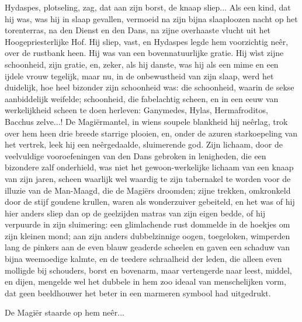 \documentclass[a4paper, 12pt, oneside, dutch]{article}
\begin{document}
Hydaspes, plotseling, zag, dat aan zijn borst, de knaap sliep... Als een kind, dat hij was, was hij in slaap gevallen, vermoeid na zijn bijna slaaploozen nacht op het torenterras, na den Dienst en den Dans, na zijne overhaaste vlucht uit het Hoogepriesterlijke Hof. Hij sliep, vast, en Hydaspes legde hem voorzichtig neêr, over de rustbank heen. Hij was van een bovennatuurlijke gratie. Hij wìst zijne schoonheid, zijn gratie, en, zeker, als hij danste, was hij als een mime en een ijdele vrouw tegelijk, maar nu, in de onbewustheid van zijn slaap, werd het duidelijk, hoe heel bizonder zijn schoonheid was: die schoonheid, waarin de sekse aanbiddelijk weifelde; schoonheid, die fabelachtig scheen, en in een eeuw van werkelijkheid scheen te doen herleven: Ganymedes, Hylas, Hermafroditos, Bacchus zelve...! De Magiërmantel, in wiens soupele blankheid hij neêrlag, trok over hem heen drie breede starrige plooien, en, onder de azuren starkoepeling van het vertrek, leek hij een neêrgedaalde, sluimerende god. Zijn lichaam, door de veelvuldige vooroefeningen van den Dans gebroken in lenigheden, die een bizondere zalf onderhield, was niet het gewoon-werkelijke lichaam van een knaap van zijn jaren, scheen waarlijk wel waardig te zijn tabernakel te worden voor de illuzie van de Man-Maagd, die de Magiërs droomden; zijne trekken, omkronkeld door de stijf goudene krullen, waren als wonderzuiver gebeiteld, en het was of hij hier anders sliep dan op de geelzijden matras van zijn eigen bedde, of hij verpuurde in zijn sluimering: een glimlachende rust dommelde in de hoekjes om zijn kleinen mond; aan zijn anders dubbelzinnige oogen, toegeloken, wimperden lang de pinkers aan de even blauw geaderde scheelen en gaven een schaduw van bijna weemoedige kalmte, en de teedere schraalheid der leden, die alleen even molligde bij schouders, borst en bovenarm, maar vertengerde naar leest, middel, en dijen, mengelde wel het dubbele in hem zoo ideaal van menschelijken vorm, dat geen beeldhouwer het beter in een marmeren symbool had uitgedrukt.

De Magiër staarde op hem neêr...
\end{document}
